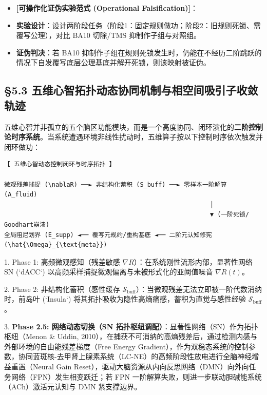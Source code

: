 \documentclass[11pt,a4paper,oneside]{ctexart}
\begin{document}
\begin{itemize}\item \textbf{[可操作化证伪实验范式 (Operational Falsification)]}：\end{itemize}
\begin{itemize}\item \textbf{实验设计}：设计两阶段任务（阶段1：固定规则做功；阶段2：旧规则死锁、需覆写公理），对比 BA10 切除/TMS 抑制作子组与对照组。\end{itemize}
\begin{itemize}\item \textbf{证伪判决}：若 BA10 抑制作子组在规则死锁发生时，仍能在不经历二阶跳跃的情况下自发覆写底层公理基底并解开死锁，则该映射被证伪。\end{itemize}

\subsection{§5.3 五维心智拓扑动态协同机制与相空间吸引子收敛轨迹}

五维心智并非孤立的五个脑区功能模块，而是一个高度协同、闭环演化的\textbf{二阶控制论时序系统}。当系统遭遇环境非线性扰动时，五维算子按以下控制时序依次触发并闭环做功：


\begin{tcolorbox}[colback=gray!5!white,colframe=gray!50!black,fontupper=\ttfamily\small]
\begin{verbatim}
【 五维心智动态控制闭环与时序拓扑 】

微观残差捕捉 (\nablaR) ──► 非结构化蓄积 (S_buff) ──► 零样本一阶解算 (A_fluid)
                                                        │
                                                        ▼ (一阶死锁/ Goodhart崩溃)
全局阻尼划界 (E_supp) ◄── 覆写元规约/重构基底 ◄── 二阶元认知修宪 (\hat{\Omega}_{\text{meta}})
\end{verbatim}
\end{tcolorbox}

1. \textit{}Phase 1: 高频微观感知（残差敏感 $\nabla R$）\textit{}：在系统刚性流形内部，显著性网络 SN (`dACC`) 以高频采样捕捉微观偏离与未被形式化的亚阈值噪音 $\nabla R(t)$。

2. \textit{}Phase 2: 非结构化蓄积（感性缓存 $\mathcal{S}_{\text{buff}}$）\textit{}：当微观残差无法立即被一阶代数消纳时，前岛叶 (`Insula`) 将其拓扑吸收为隐性高熵痛感，蓄积为直觉与感性经验 $\mathcal{S}_{\text{buff}}$。

3. \textbf{Phase 2.5: 网络动态切换（SN 拓扑枢纽调配）}：显著性网络（SN）作为拓扑枢纽（Menon \& Uddin, 2010），在捕获不可消纳的高熵残差后，通过检测内感与外部环境的自由能残差梯度（Free Energy Gradient），作为双稳态系统的控制参数，协同蓝斑核-去甲肾上腺素系统（LC-NE）的高频阶段性放电进行全脑神经增益重置（Neural Gain Reset），驱动大脑资源从内向反思网络（DMN）向外向任务网络（FPN）发生相变跃迁；若 FPN 一阶解算失败，则进一步联动胆碱能系统（ACh）激活元认知与 DMN 紧支撑边界。
\end{document}
